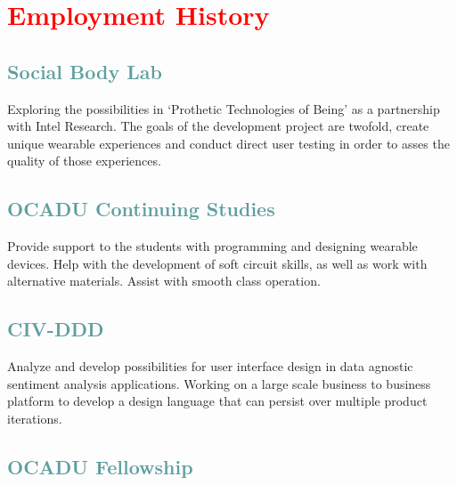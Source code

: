 \section{\textcolor{red}{Employment History}}

\subsection{\textcolor{CadetBlue}{\LARGE{Social Body Lab}}} 

Exploring the possibilities in `Prothetic Technologies of Being' as a partnership with Intel Research. The goals of the development project are twofold, create unique wearable experiences and conduct direct user testing in order to asses the quality of those experiences.

\subsection{\textcolor{CadetBlue}{\LARGE{OCADU Continuing Studies}}} 

Provide support to the students with programming and designing wearable devices. Help with the development of soft circuit skills, as well as work with alternative materials. Assist with smooth class operation. 

\subsection{\textcolor{CadetBlue}{\LARGE{CIV-DDD}}} 

Analyze and develop possibilities for user interface design in data agnostic sentiment analysis applications. Working on a large scale business to business platform to develop a design language that can persist over multiple product iterations.

\subsection{\textcolor{CadetBlue}{\LARGE{OCADU Fellowship}}} 


